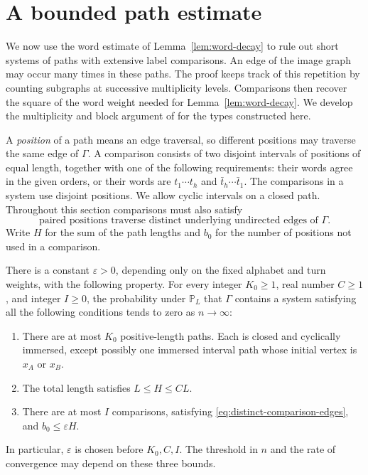 \section{A bounded path estimate}\label{sec:patterns}

We now use the word estimate of Lemma~\ref{lem:word-decay} to rule out
short systems of paths with extensive label comparisons.  An edge of the
image graph may occur many times in these paths.  The proof keeps track of
this repetition by counting subgraphs at successive multiplicity levels.
Comparisons then recover the square of the word weight needed for
Lemma~\ref{lem:word-decay}.  We develop the multiplicity and block argument
of \cite[Section~``A bounded-pattern estimate'']{OpenAI2026ZD} for the
types constructed here.

A \emph{position} of a path means an edge traversal, so different
positions may traverse the same edge of $\Gamma$.  A comparison consists
of two disjoint intervals of positions of equal length, together with
one of the following requirements: their words agree in the given
orders, or their words are $t_1\cdots t_h$ and
$\bar t_h\cdots\bar t_1$.
The comparisons in a system use disjoint positions.  We allow cyclic
intervals on a closed path.  Throughout this section comparisons must
also satisfy
\begin{equation}\label{eq:distinct-comparison-edges}
 \text{paired positions traverse distinct underlying undirected
 edges of $\Gamma$.}
\end{equation}
Write $H$ for the sum of the path lengths and $b_0$ for the number of
positions not used in a comparison.

\begin{theorem}\label{thm:bounded-patterns}
There is a constant $\varepsilon>0$, depending only on the fixed
alphabet and turn weights, with the following property.  For every
integer $K_0\geq1$, real number $C\geq1$, and integer $I\geq0$, the
probability under $\mathbb P_L$ that $\Gamma$ contains a system satisfying
all the following conditions tends to zero as $n\longrightarrow\infty$:
\begin{enumerate}
 \item There are at most $K_0$ positive-length paths.  Each is closed
 and cyclically immersed, except possibly one immersed interval path
 whose initial vertex is $x_A$ or $x_B$.
 \item The total length satisfies $L\leq H\leq CL$.
 \item There are at most $I$ comparisons, satisfying
 \eqref{eq:distinct-comparison-edges}, and $b_0\leq\varepsilon H$.
\end{enumerate}
In particular, $\varepsilon$ is chosen before $K_0,C,I$.  The threshold
in $n$ and the rate of convergence may depend on these three bounds.
\end{theorem}


